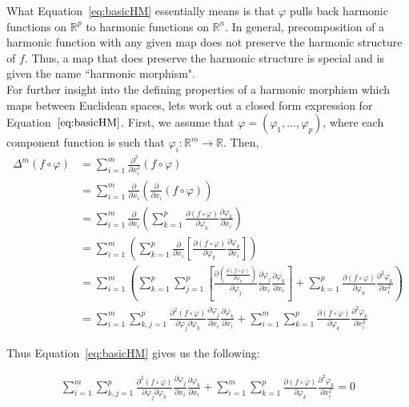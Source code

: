 \documentclass[12pt]{article}
\theoremstyle{definition}
\numberwithin{equation}{subsection}
\begin{document}
What Equation~\ref{eq:basicHM} essentially means is that $\varphi$ pulls back harmonic functions on $\mathbb{R}^p$ to harmonic functions on $\mathbb{R}^n$. In general, precomposition of a harmonic function with any given map does not preserve the harmonic structure of $f$. Thus, a map that does preserve the harmonic structure is special and is given the name ``harmonic morphism".\\ 
\indent For further insight into the defining properties of a harmonic morphism which maps between Euclidean spaces, lets work out a closed form expression for Equation~$\ref{eq:basicHM}$. First, we assume that $\varphi = (\varphi_1 , \dots , \varphi_p)$, where each component function is such that $\varphi_i: \mathbb{R}^m \rightarrow \mathbb{R}$. Then, 
\begin{align*}
\Delta^m(f\circ\varphi) &=\sum_{i =1}^{m}\frac{\partial^2}{\partial x_i^2}\left(f\circ\varphi\right)   \\
 &= \sum_{i =1}^{m} \frac{\partial}{\partial x_i} \left(\frac{\partial}{\partial x_i}(f\circ\varphi)  \right) \\
&=\sum_{i =1}^{m} \frac{\partial}{\partial x_i} \left(\sum_{k=1}^p \frac{\partial(f\circ\varphi) }{\partial \varphi_k} \frac{\partial \varphi_k}{\partial x_i}  \right)\\
&=\sum_{i =1}^{m} \left(\sum_{k=1}^p  \frac{\partial}{\partial x_i} \left[\frac{\partial(f\circ\varphi) }{\partial \varphi_k} \frac{\partial \varphi_k}{\partial x_i} \right]  \right)\\
&=\sum_{i =1}^{m} \left(\sum_{k=1}^p \sum_{j=1}^p  \left[ \frac{\partial  \left(\frac{\partial(f\circ\varphi)}{\partial \varphi_k}\right)}{\partial \varphi_j} \frac{\partial \varphi_j}{\partial x_i} \frac{\partial \varphi_k}{\partial x_i}\right]  + \sum_{k=1}^p \frac{\partial(f\circ\varphi) }{\partial \varphi_k} \frac{\partial^2\varphi_k}{\partial x_i^2}   \right)\\
&=\sum_{i =1}^{m} \sum_{k,j=1}^p   \frac{\partial^2  \left(f\circ\varphi\right)}{\partial \varphi_j \partial \varphi_k} \frac{\partial \varphi_j}{\partial x_i} \frac{\partial \varphi_k}{\partial x_i} + \sum_{i =1}^{m} \sum_{k=1}^p \frac{\partial(f\circ\varphi) }{\partial \varphi_k} \frac{\partial^2\varphi_k}{\partial x_i^2}  
\end{align*}

Thus Equation~\ref{eq:basicHM} gives us the following:

\begin{align}\label{eq:closedformBasicHM}
   \sum_{i =1}^{m} \sum_{k,j=1}^p   \frac{\partial^2  \left(f\circ\varphi\right)}{\partial \varphi_j \partial \varphi_k} \frac{\partial \varphi_j}{\partial x_i} \frac{\partial \varphi_k}{\partial x_i} + \sum_{i =1}^{m} \sum_{k=1}^p \frac{\partial(f\circ\varphi) }{\partial \varphi_k} \frac{\partial^2\varphi_k}{\partial x_i^2}   = 0
\end{align}
\end{document}
